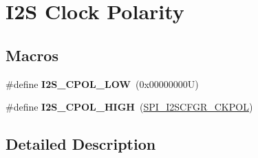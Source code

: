 \hypertarget{group___i2_s___clock___polarity}{}\section{I2S Clock Polarity}
\label{group___i2_s___clock___polarity}
\subsection*{Macros}
\begin{DoxyCompactItemize}
\item 
\mbox{\label{group___i2_s___clock___polarity_gad930e30055218df3f34d9ab96d31a3f4}} 
\#define {\bfseries I2\+S\+\_\+\+C\+P\+O\+L\+\_\+\+L\+OW}~(0x00000000\+U)
\item 
\mbox{\label{group___i2_s___clock___polarity_gab86bbe2d41b941d9949868ca3578e607}} 
\#define {\bfseries I2\+S\+\_\+\+C\+P\+O\+L\+\_\+\+H\+I\+GH}~(\hyperlink{group___peripheral___registers___bits___definition_ga5c5be1f1c8b4689643e04cd5034e7f5f}{S\+P\+I\+\_\+\+I2\+S\+C\+F\+G\+R\+\_\+\+C\+K\+P\+OL})
\end{DoxyCompactItemize}


\subsection{Detailed Description}
